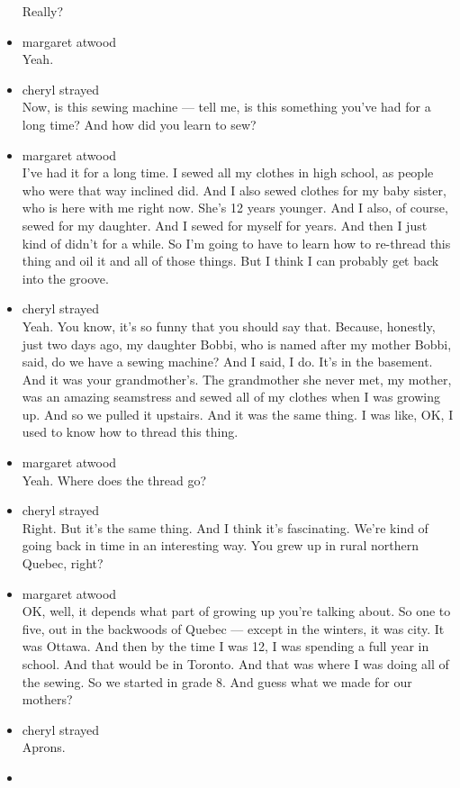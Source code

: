 \begin{itemize}
  Really?
\item
  margaret atwood\\
  Yeah.
\item
  cheryl strayed\\
  Now, is this sewing machine --- tell me, is this something you've had
  for a long time? And how did you learn to sew?
\item
  margaret atwood\\
  I've had it for a long time. I sewed all my clothes in high school, as
  people who were that way inclined did. And I also sewed clothes for my
  baby sister, who is here with me right now. She's 12 years younger.
  And I also, of course, sewed for my daughter. And I sewed for myself
  for years. And then I just kind of didn't for a while. So I'm going to
  have to learn how to re-thread this thing and oil it and all of those
  things. But I think I can probably get back into the groove.
\item
  cheryl strayed\\
  Yeah. You know, it's so funny that you should say that. Because,
  honestly, just two days ago, my daughter Bobbi, who is named after my
  mother Bobbi, said, do we have a sewing machine? And I said, I do.
  It's in the basement. And it was your grandmother's. The grandmother
  she never met, my mother, was an amazing seamstress and sewed all of
  my clothes when I was growing up. And so we pulled it upstairs. And it
  was the same thing. I was like, OK, I used to know how to thread this
  thing.
\item
  margaret atwood\\
  Yeah. Where does the thread go?
\item
  cheryl strayed\\
  Right. But it's the same thing. And I think it's fascinating. We're
  kind of going back in time in an interesting way. You grew up in rural
  northern Quebec, right?
\item
  margaret atwood\\
  OK, well, it depends what part of growing up you're talking about. So
  one to five, out in the backwoods of Quebec --- except in the winters,
  it was city. It was Ottawa. And then by the time I was 12, I was
  spending a full year in school. And that would be in Toronto. And that
  was where I was doing all of the sewing. So we started in grade 8. And
  guess what we made for our mothers?
\item
  cheryl strayed\\
  Aprons.
\item

\end{itemize}
